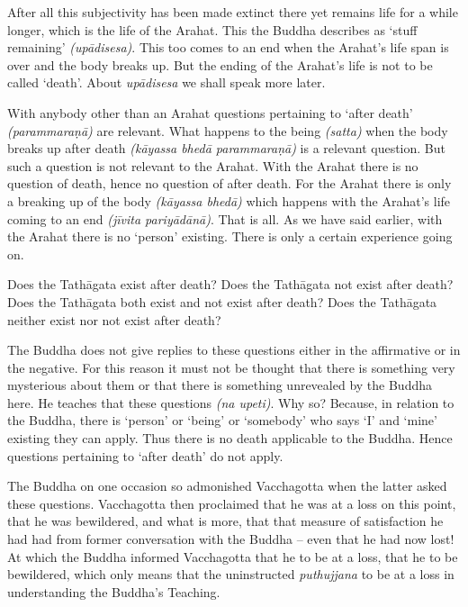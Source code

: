 After all this subjectivity has been made extinct there yet remains life for a while longer, which is the life of the Arahat. This the Buddha describes as `stuff remaining' \emph{(upādisesa)}. This too comes to an end when the Arahat's life span is over and the body breaks up. But the ending of the Arahat's life is not to be called `death'. About \emph{upādisesa} we shall speak more later.

With anybody other than an Arahat questions pertaining to `after death' \emph{(parammaraṇā)} are relevant. What happens to the being \emph{(satta)} when the body breaks up after death \emph{(kāyassa bhedā parammaraṇā)} is a relevant question. But such a question is not relevant to the Arahat. With the Arahat there is no question of death, hence no question of after death. For the Arahat there is only a breaking up of the body \emph{(kāyassa bhedā)} which happens with the Arahat's life coming to an end \emph{(jīvita pariyādānā)}. That is all. As we have said earlier, with the Arahat there is no `person' existing. There is only a certain experience going on.

Does the Tathāgata exist after death? Does the Tathāgata not exist after death? Does the Tathāgata both exist and not exist after death? Does the Tathāgata neither exist nor not exist after death?

The Buddha does not give replies to these questions either in the affirmative or in the negative. For this reason it must not be thought that there is something very mysterious about them or that there is something unrevealed by the Buddha here. He teaches that these questions  \emph{(na upeti)}. Why so? Because, in relation to the Buddha, there is  `person' or `being' or `somebody' who says `I' and `mine' existing  they can apply. Thus there is no death applicable to the Buddha. Hence questions pertaining to `after death' do not apply.

The Buddha on one occasion so admonished Vacchagotta when the latter asked these questions. Vacchagotta then proclaimed that he was at a loss on this point, that he was bewildered, and what is more, that that measure of satisfaction he had had from former conversation with the Buddha -- even that he had now lost! At which the Buddha informed Vacchagotta that he  to be at a loss, that he  to be bewildered, which only means that the uninstructed \emph{puthujjana}  to be at a loss in understanding the Buddha's Teaching.

